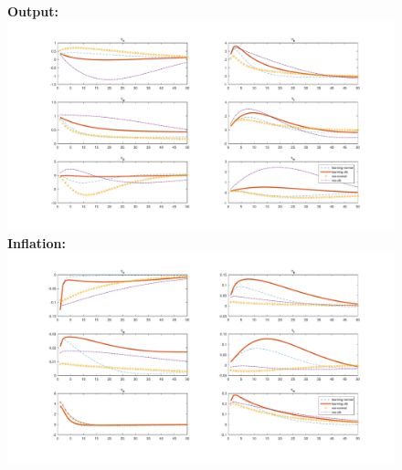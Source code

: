 \documentclass[12pt,reqno]{article}
\numberwithin{equation}{section}
\begin{document}
\begin{figure}[H]
\textbf{Output:}\\
\includegraphics[scale=0.5]{MSV_impresp_output_riseComp.pdf}
\textbf{Inflation:}\\
\includegraphics[scale=0.5]{MSV_impresp_pinf_riseComp.pdf}

\end{figure}
\end{document}
